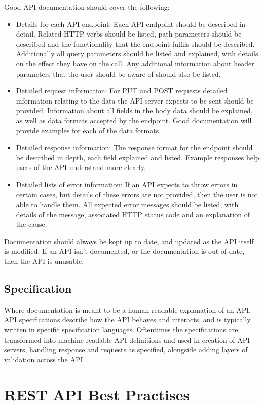 Good API documentation should cover the following:
\begin{itemize}
    \item Details for each API endpoint: Each API endpoint should be described in detail. Related HTTP verbs should be listed, path parameters should be described and the functionality that the endpoint fulfils should be described. Additionally all query parameters should be listed and explained, with details on the effect they have on the call. Any additional information about header parameters that the user should be aware of should also be listed.
    \item Detailed request information: For PUT and POST requests detailed information relating to the data the API server expects to be sent should be provided. Information about all fields in the body data should be explained, as well as data formats accepted by the endpoint. Good documentation will provide examples for each of the data formats.
    \item Detailed response information: The response format for the endpoint should be described in depth, each field explained and listed. Example responses help users of the API understand more clearly. 
    \item Detailed lists of error information: If an API expects to throw errors in certain cases, but details of these errors are not provided, then the user is not able to handle them. All expected error messages should be listed, with details of the message, associated HTTP status code and an explanation of the cause. 
\end{itemize}
Documentation should always be kept up to date, and updated as the API itself is modified. If an API isn't documented, or the documentation is out of date, then the API is unusable.

\subsection{Specification}
Where documentation is meant to be a human-readable explanation of an API, API specifications describe how the API behaves and interacts, and is typically written in specific specification languages. Oftentimes the specifications are transformed into machine-readable API definitions and used in creation of API servers, handling response and requests as specified, alongside adding layers of validation across the API.

\section{REST API Best Practises}
